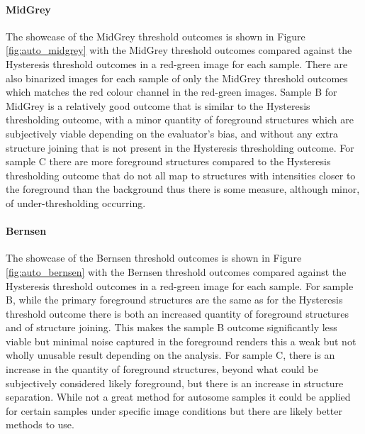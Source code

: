 \paragraph{MidGrey} The showcase of the MidGrey threshold outcomes is shown in Figure \ref{fig:auto_midgrey} with the MidGrey threshold outcomes compared against the Hysteresis threshold outcomes in a red-green image for each sample. There are also binarized images for each sample of only the MidGrey threshold outcomes which matches the red colour channel in the red-green images. Sample B for MidGrey is a relatively good outcome that is similar to the Hysteresis thresholding outcome, with a minor quantity of foreground structures which are subjectively viable depending on the evaluator's bias, and without any extra structure joining that is not present in the Hysteresis thresholding outcome. For sample C there are more foreground structures compared to the Hysteresis thresholding outcome that do not all map to structures with intensities closer to the foreground than the background thus there is some measure, although minor, of under-thresholding occurring.

\FloatBarrier

\paragraph{Bernsen} The showcase of the Bernsen threshold outcomes is shown in Figure \ref{fig:auto_bernsen} with the Bernsen threshold outcomes compared against the Hysteresis threshold outcomes in a red-green image for each sample. For sample B, while the primary foreground structures are the same as for the Hysteresis threshold outcome there is both an increased quantity of foreground structures and of structure joining. This makes the sample B outcome significantly less viable but minimal noise captured in the foreground renders this a weak but not wholly unusable result depending on the analysis. For sample C, there is an increase in the quantity of foreground structures, beyond what could be subjectively considered likely foreground, but there is an increase in structure separation. While not a great method for autosome samples it could be applied for certain samples under specific image conditions but there are likely better methods to use.

